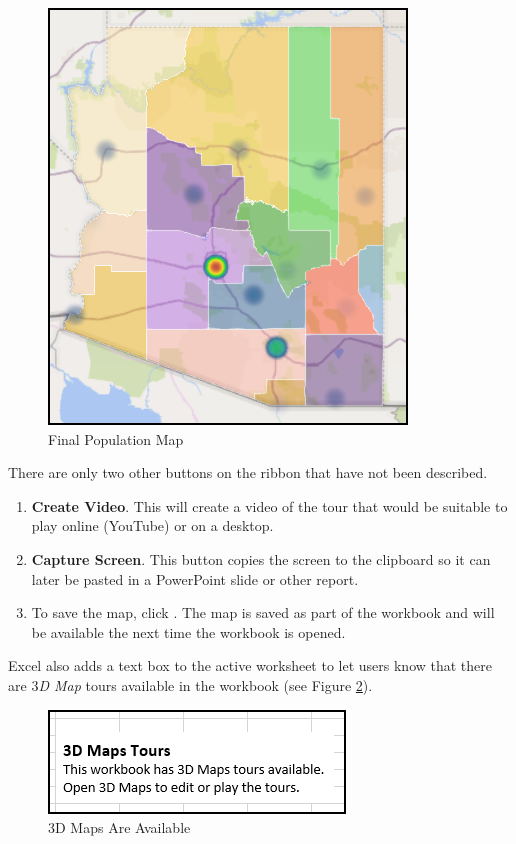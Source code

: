 \begin{figure}[H]
	\centering
	\includegraphics[width=\maxwidth{.50\linewidth}]{gfx/ch08_fig29}
	\caption{Final Population Map}
	\label{08:fig29}
\end{figure}

There are only two other buttons on the ribbon that have not been described.

\begin{enumerate}[resume]
	\item \textbf{Create Video}. This will create a video of the tour that would be suitable to play online (YouTube) or on a desktop.
	\item \textbf{Capture Screen}. This button copies the screen to the clipboard so it can later be pasted in a PowerPoint slide or other report.
	\item To save the map, click . The map is saved as part of the workbook and will be available the next time the workbook is opened. 
\end{enumerate}

Excel also adds a text box to the active worksheet to let users know that there are \textit{$ 3 $D Map} tours available in the workbook (see Figure \ref{08:fig30}).

\begin{figure}[H]
	\centering
	\includegraphics[width=\maxwidth{.65\linewidth}]{gfx/ch08_fig30}
	\caption{$ 3 $D Maps Are Available}
	\label{08:fig30}
\end{figure}

